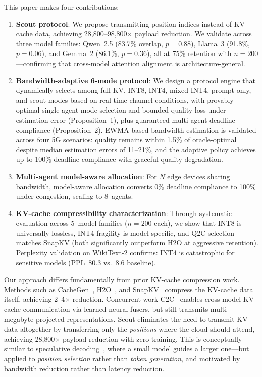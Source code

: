 \documentclass[journal]{IEEEtran}
\newcommand{\QtoC}{\textsc{Q2C}\xspace}
\begin{document}
This paper makes four contributions:

\begin{enumerate}
    \item \textbf{Scout protocol}: We propose transmitting position indices instead of KV-cache data, achieving 28{,}800--98{,}800$\times$ payload reduction. We validate across three model families: Qwen~2.5 (83.7\% overlap, $p = 0.88$), Llama~3 (91.8\%, $p = 0.06$), and Gemma~2 (86.1\%, $p = 0.36$), all at 75\% retention with $n = 200$---confirming that cross-model attention alignment is architecture-general.

    \item \textbf{Bandwidth-adaptive 6-mode protocol}: We design a protocol engine that dynamically selects among full-KV, INT8, INT4, mixed-INT4, prompt-only, and scout modes based on real-time channel conditions, with provably optimal single-agent mode selection and bounded quality loss under estimation error (Proposition~1), plus guaranteed multi-agent deadline compliance (Proposition~2). EWMA-based bandwidth estimation is validated across four 5G scenarios: quality remains within 1.5\% of oracle-optimal despite median estimation errors of 11--21\%, and the adaptive policy achieves up to 100\% deadline compliance with graceful quality degradation.

    \item \textbf{Multi-agent model-aware allocation}: For $N$ edge devices sharing bandwidth, model-aware allocation converts 0\% deadline compliance to 100\% under congestion, scaling to 8~agents.

    \item \textbf{KV-cache compressibility characterization}: Through systematic evaluation across 5~model families ($n = 200$ each), we show that INT8 is universally lossless, INT4 fragility is model-specific, and \QtoC selection matches SnapKV (both significantly outperform H2O at aggressive retention). Perplexity validation on WikiText-2 confirms: INT4 is catastrophic for sensitive models (PPL~80.3 vs.~8.6 baseline).
\end{enumerate}

Our approach differs fundamentally from prior KV-cache compression work.
Methods such as CacheGen~\cite{cachegen}, H2O~\cite{h2o}, and SnapKV~\cite{snapkv} compress the KV-cache data itself, achieving 2--4$\times$ reduction.
Concurrent work C2C~\cite{c2c} enables cross-model KV-cache communication via learned neural fusers, but still transmits multi-megabyte projected representations.
Scout eliminates the need to transmit KV data altogether by transferring only the \emph{positions} where the cloud should attend, achieving 28{,}800$\times$ payload reduction with zero training.
This is conceptually similar to speculative decoding~\cite{speculativedecoding}, where a small model guides a larger one---but applied to \emph{position selection} rather than \emph{token generation}, and motivated by bandwidth reduction rather than latency reduction.
\end{document}
